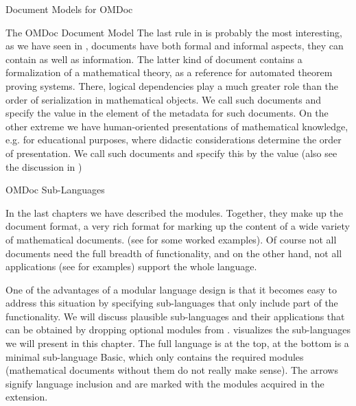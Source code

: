 \begin{tchapter}[id=document-model]{Document Models for OMDoc}
\begin{tsection}[id=omdom]{The OMDoc Document Model}
The last rule in {} is probably the most interesting, as we have seen in
{}, {\omdoc} documents have both formal and informal
aspects, they can contain {} as well as {}
information.  The latter kind of document contains a formalization of a mathematical
theory, as a reference for automated theorem proving systems. There, logical dependencies
play a much greater role than the order of serialization in mathematical objects.  We call
such documents {} and specify the value {} in the
{} element of the {\omdoc} metadata for such documents.  On the
other extreme we have human-oriented presentations of mathematical knowledge, e.g.  for
educational purposes, where didactic considerations determine the order of
presentation. We call such documents {} and specify this by
the value {} (also see the discussion in {})
\end{tsection}

\begin{tsection}[id=sub-languages]{OMDoc Sub-Languages}

  In the last chapters we have described the {\omdoc} modules. Together, they make up the
  {\omdoc} document format, a very rich format for marking up the content of a wide
  variety of mathematical documents. (see {} for some worked
  examples). Of course not all documents need the full breadth of {\omdoc} functionality,
  and on the other hand, not all {\omdoc} applications (see {} for
  examples) support the whole language.

  One of the advantages of a modular language design is that it becomes easy to address
  this situation by specifying sub-languages that only include part of the
  functionality. We will discuss plausible {\omdoc} sub-languages and their applications
  that can be obtained by dropping optional modules from {\omdoc}.
  {} visualizes the sub-languages we will present in this
  chapter. The full language {\omdoc} is at the top, at the bottom is a minimal
  sub-language {\omdoc} Basic, which only contains the required modules (mathematical
  documents without them do not really make sense). The arrows signify language inclusion
  and are marked with the modules acquired in the extension.


\end{tsection}
\end{tchapter}
